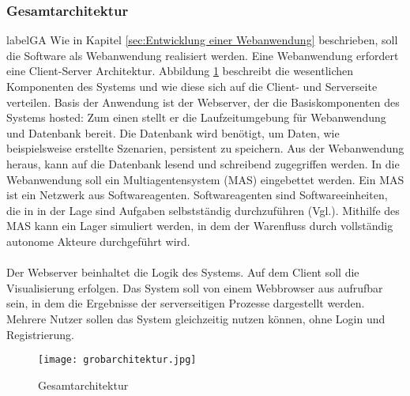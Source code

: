 \subsubsection{Gesamtarchitektur}label{GA} 
Wie in Kapitel \ref{sec:Entwicklung einer Webanwendung} beschrieben, soll die Software als Webanwendung realisiert werden. Eine Webanwendung erfordert eine Client-Server Architektur. Abbildung \ref{Gesamtarchitektur} beschreibt die wesentlichen Komponenten des Systems und wie diese sich auf die Client- und Serverseite verteilen. Basis der Anwendung ist der Webserver, der die Basiskomponenten des Systems hosted: Zum einen stellt er die Laufzeitumgebung für Webanwendung und Datenbank bereit. Die Datenbank wird benötigt, um Daten, wie beispielsweise erstellte Szenarien, persistent zu speichern. Aus der Webanwendung heraus, kann auf die Datenbank lesend und schreibend zugegriffen werden. In die Webanwendung soll ein Multiagentensystem (MAS) eingebettet werden. Ein MAS ist ein Netzwerk aus Softwareagenten. Softwareagenten sind Softwareeinheiten, die in in der Lage sind Aufgaben selbstständig durchzuführen (Vgl.\cite{mas}). Mithilfe des MAS kann ein Lager simuliert werden, in dem der Warenfluss durch vollständig autonome Akteure durchgeführt wird. 
\\\\
Der Webserver beinhaltet die Logik des Systems. Auf dem Client soll die Visualisierung erfolgen. Das System soll von einem Webbrowser aus aufrufbar sein, in dem die Ergebnisse der serverseitigen Prozesse dargestellt werden. Mehrere Nutzer sollen das System gleichzeitig nutzen können, ohne Login und Registrierung.

\begin{figure}[h!]
	\centering
		\texttt{[image: grobarchitektur.jpg]}        
		\caption{Gesamtarchitektur}
	\label{Gesamtarchitektur}
\end{figure} 
\newpage
